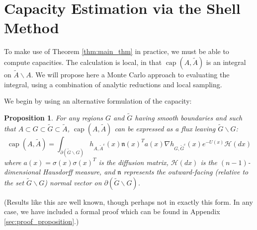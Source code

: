 \documentclass[12pt, nofootinbib,english, amsmath, amssymb, aps, priprint, graphicx,floatfix]{revtex4-1}
\newtheorem{proposition}{Proposition}
\theoremstyle{plain}
\theoremstyle{definition}
\theoremstyle{plain}
\newcommand{\normal}{{\mathfrak{n}}}
\newcommand{\capac}[2]{\ensuremath{\operatorname{cap}}(#1,#2)}
\newcommand{\hausdorffmeasure}{\mathscr{H}(dx)}
\newcommand{\tA}{{\tilde A}}
\begin{document}
\section{Capacity Estimation via the Shell Method}
\label{sec:Estimation}
To make use of Theorem \ref{thm:main_thm} in practice, we must be able to compute capacities.  The calculation is local, in that $\capac{A}{\tilde{A}}$ is an integral on $\tA\backslash A$. We will propose here a Monte Carlo approach to evaluating the integral, using a combination of analytic reductions and local sampling. 

We begin by using an alternative formulation of the capacity:

\begin{proposition}
\label{prop:flux}
For any regions $G$ and $\tilde{G}$ having smooth boundaries and such that $A\subset G \subset \tilde G \subset \tilde A$, $\capac{A}{\tA}$ can be expressed as a flux leaving $\tilde G \backslash G$:
\begin{equation}
\label{eqn:GIntegral}
\ensuremath{\operatorname{cap}} (A, \tilde{A}) = \int_{\partial (\tilde G \backslash G)}  h_{A, \tilde{A}^c} (x)   \normal(x)^T a (x) \nabla h_{G, \tilde{G}^c} (x)e^{- U (x)} \hausdorffmeasure
\end{equation}
where $a(x)=\sigma(x)\sigma(x)^T$ is the diffusion matrix, $\hausdorffmeasure$ is the $(n-1)$-dimensional Hausdorff measure, and $\normal$ represents the outward-facing (relative to the set $\tilde G \backslash G$) normal vector on $\partial (\tilde G \backslash G)$.
\end{proposition}
\noindent (Results like this are well known, though perhaps not in exactly this form. In any case, we have included a formal proof which can be found in Appendix \ref{sec:proof_proposition}.)
\end{document}
